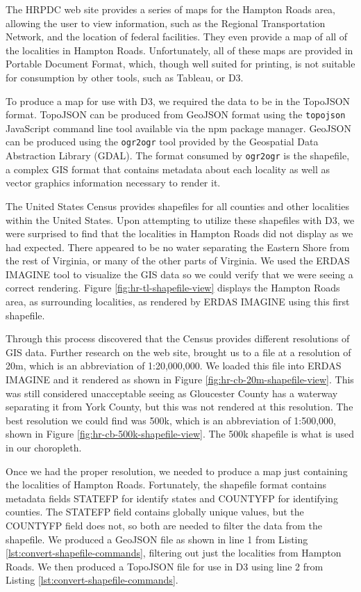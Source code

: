 \documentclass[10pt,journal,compsoc]{IEEEtran}
\begin{document}
The HRPDC web site provides a series of maps for the Hampton Roads area, allowing the user to view information, such as the Regional Transportation Network, and the location of federal facilities\cite{hrpdc-maps-gis}.  They even provide a map of all of the localities in Hampton Roads.  Unfortunately, all of these maps are provided in Portable Document Format, which, though well suited for printing, is not suitable for consumption by other tools, such as Tableau, or D3.

To produce a map for use with D3, we required the data to be in the TopoJSON format.  TopoJSON can be produced from GeoJSON format using the {\tt topojson} JavaScript command line tool available via the npm package manager\cite{npm}.  GeoJSON can be produced using the {\tt ogr2ogr} tool provided by the Geospatial Data Abstraction Library (GDAL)\cite{gdal-site}.  The format consumed by {\tt ogr2ogr} is the shapefile, a complex GIS format that contains metadata about each locality as well as vector graphics information necessary to render it.

The United States Census provides shapefiles for all counties and other localities within the United States.  Upon attempting to utilize these shapefiles with D3, we were surprised to find that the localities in Hampton Roads did not display as we had expected.  There appeared to be no water separating the Eastern Shore from the rest of Virginia, or many of the other parts of Virginia.  We used the ERDAS IMAGINE tool to visualize the GIS data so we could verify that we were seeing a correct rendering.  Figure \ref{fig:hr-tl-shapefile-view} displays the Hampton Roads area, as surrounding localities, as rendered by ERDAS IMAGINE using this first shapefile.

Through this process discovered that the Census provides different resolutions of GIS data.  Further research on the web site, brought us to a file at a resolution of 20m, which is an abbreviation of 1:20,000,000.  We loaded this file into ERDAS IMAGINE and it rendered as shown in Figure \ref{fig:hr-cb-20m-shapefile-view}.  This was still considered unacceptable seeing as Gloucester County has a waterway separating it from York County, but this was not rendered at this resolution.  The best resolution we could find was 500k, which is an abbreviation of 1:500,000, shown in Figure \ref{fig:hr-cb-500k-shapefile-view}.  The 500k shapefile is what is used in our choropleth.

Once we had the proper resolution, we needed to produce a map just containing the localities of Hampton Roads.  Fortunately, the shapefile format contains metadata fields STATEFP for identify states and COUNTYFP for identifying counties.  The STATEFP field contains globally unique values, but the COUNTYFP field does not, so both are needed to filter the data from the shapefile.  We produced a GeoJSON file as shown in line 1 from Listing \ref{lst:convert-shapefile-commands}, filtering out just the localities from Hampton Roads.  We then produced a TopoJSON file for use in D3 using line 2 from Listing \ref{lst:convert-shapefile-commands}.
\end{document}
